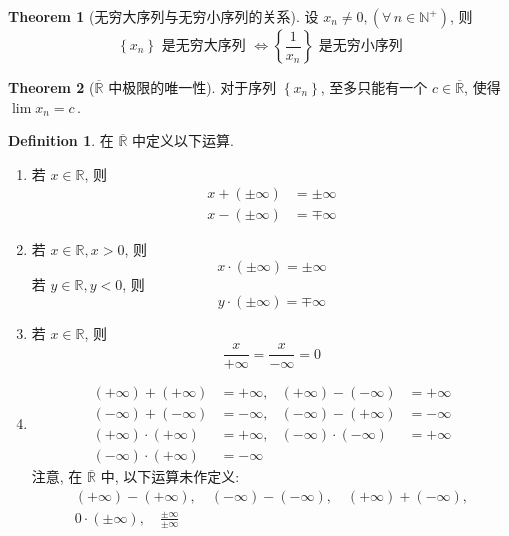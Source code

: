 \documentclass{book}
\newcommand{\bideduce}{\Longleftrightarrow}
\newcommand{\Any}{\forall\,}
\newcommand{\set}[1]{\left\{#1\right\}}
\newcommand{\exR}{\overline{\mathbb{R}}}
\newcommand{\R}{\mathbb{R}}
\newcommand{\N}{\mathbb{N}}
\numberwithin{equation}{section}
\numberwithin{figure}{section}
\theoremstyle{definition}
\newtheorem{definition}{Definition}
\newtheorem{theorem}{Theorem}[section]
\begin{document}
\begin{theorem}[无穷大序列与无穷小序列的关系]
  \leavevmode

  设 $x_n\neq0,(\Any n\in\N^+)$, 则
  \begin{equation*}
    \set{x_n}\text{ 是无穷大序列 }\bideduce \set{\frac{1}{x_n}}\text{ 是无穷小序列}
  \end{equation*}
\end{theorem}

\begin{theorem}[$\exR$ 中极限的唯一性]
  \leavevmode

  对于序列 $\set{x_n}$, 至多只能有一个 $c\in\exR$, 使得 $\lim x_n=c$\,.
\end{theorem}

\begin{definition}
  在 $\exR$ 中定义以下运算.
  \begin{enumerate}
    \item 若 $x\in\R$, 则
      \begin{align*}
	x+(\pm\infty)&=\pm\infty\\
	x-(\pm\infty)&=\mp\infty
      \end{align*}
    \item 若 $x\in\R,x>0$, 则
      \begin{equation*}
	x\cdot(\pm\infty)=\pm\infty
      \end{equation*}
      若 $y\in\R,y<0$, 则
      \begin{equation*}
	y\cdot(\pm\infty)=\mp\infty
      \end{equation*}
    \item 若 $x\in\R$, 则
      \begin{equation*}
	\frac{x}{+\infty}=\frac{x}{-\infty}=0
      \end{equation*}
    \item 
      \begin{align*}
	(+\infty)+(+\infty)&=+\infty,&(+\infty)-(-\infty)&=+\infty\\
	(-\infty)+(-\infty)&=-\infty,&(-\infty)-(+\infty)&=-\infty\\
	(+\infty)\cdot(+\infty)&=+\infty,&(-\infty)\cdot(-\infty)&=+\infty\\
	(-\infty)\cdot(+\infty)&=-\infty&&
      \end{align*}
      注意, 在 $\exR$ 中, 以下运算未作定义:
      \begin{gather*}
	(+\infty)-(+\infty),\quad (-\infty)-(-\infty),\quad (+\infty)+(-\infty),\\
	0\cdot(\pm\infty),\quad\frac{\pm\infty}{\pm\infty}
      \end{gather*}
  \end{enumerate}
\end{definition}
\end{document}
